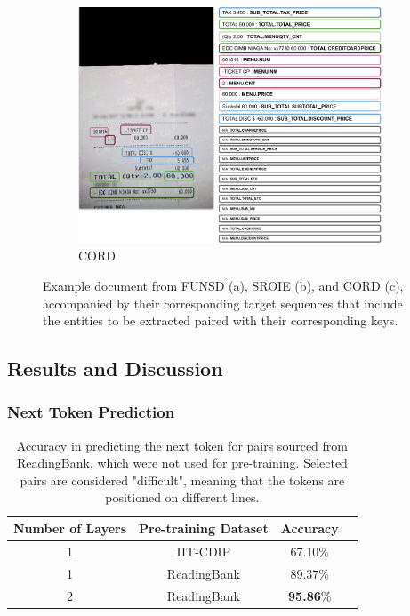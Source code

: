 \begin{figure}
  \begin{subfigure}[b]{0.6\textwidth}
    \includegraphics[width=\textwidth]{images/chapter4/cord_sample_and_output.pdf}
    \caption{CORD}
  \end{subfigure}
  \caption{Example document from FUNSD (a), SROIE (b), and CORD (c), accompanied by their corresponding target sequences that include the entities to be extracted paired with their corresponding keys.}
    \label{fig:source-target-sample}
\end{figure}

\subsection{Results and Discussion}

\subsubsection{Next Token Prediction}

\begin{table}
  \centering
  \small
  \begin{adjustbox}{max width=\textwidth}
  \begin{threeparttable}
  \begin{tabular}{cccc}
      \toprule
          Number of Layers & Pre-training Dataset & Accuracy \\ 
      \midrule
          1                & IIT-CDIP             & 67.10\%  \\
          1                & ReadingBank          & 89.37\%  \\
          2                & ReadingBank          & \textbf{95.86}\%   \\
      \bottomrule
  \end{tabular}
  \end{threeparttable}
  \end{adjustbox}
  \caption{Accuracy in predicting the next token for pairs sourced from ReadingBank, which were not used for pre-training. Selected pairs are considered "difficult", meaning that the tokens are positioned on different lines.}
  \label{table:next-token-prediction-results}
\end{table}

